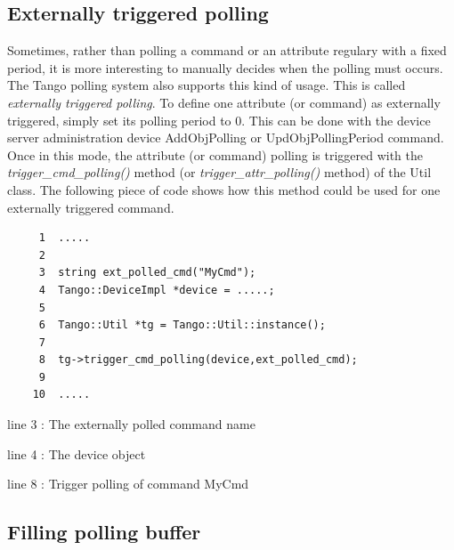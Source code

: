 \subsection{Externally triggered polling}

Sometimes, rather than polling a command or an attribute regulary
with a fixed period, it is more interesting to \textquotedbl{}manually\textquotedbl{}
decides when the polling must occurs. The Tango polling system also
supports this kind of usage. This is called \emph{externally triggered
polling}. To define one attribute (or command) as externally triggered,
simply set its polling period to 0. This can be done with the device
server administration device AddObjPolling or UpdObjPollingPeriod
command. Once in this mode, the attribute (or command) polling is
triggered with the \emph{trigger\_cmd\_polling()} method (or \emph{trigger\_attr\_polling()}
method) of the Util class. The following piece of code shows how this
method could be used for one externally triggered command.


\begin{verbatim}
     1  .....
     2  
     3  string ext_polled_cmd("MyCmd");
     4  Tango::DeviceImpl *device = .....;
     5  
     6  Tango::Util *tg = Tango::Util::instance();
     7  
     8  tg->trigger_cmd_polling(device,ext_polled_cmd);
     9  
    10  .....

\end{verbatim}


line 3 : The externally polled command name

line 4 : The device object

line 8 : Trigger polling of command MyCmd


\subsection{Filling polling buffer}

